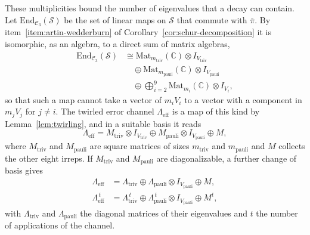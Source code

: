 These multiplicities bound the number of eigenvalues that a decay can contain. Let $\mathrm{End}_{\mathcal{C}_3}(\mathcal{S})$ be the set of linear maps on $\mathcal{S}$ that commute with $\bar\pi$. By item~\ref{item:artin-wedderburn} of Corollary~\ref{cor:schur-decomposition} it is isomorphic, as an algebra, to a direct sum of matrix algebras,
\begin{align}
    \mathrm{End}_{\mathcal{C}_3}(\mathcal{S}) &\cong \mathrm{Mat}_{m_{\mathrm{triv}}}(\mathbb{C}) \otimes I_{V_{\mathrm{triv}}} \nonumber \\
    &\quad \oplus \mathrm{Mat}_{m_{\mathrm{pauli}}}(\mathbb{C})\otimes I_{V_{\mathrm{pauli}}} \nonumber \\
    &\quad \oplus \bigoplus_{i = 2}^9 \mathrm{Mat}_{m_i} (\mathbb{C}) \otimes I_{V_i} ,
\end{align}
so that such a map cannot take a vector of $m_i V_i$ to a vector with a component in $m_j V_j$ for $j \neq i$. The twirled error channel $\Lambda_{\mathrm{eff}}$ is a map of this kind by Lemma~\ref{lem:twirling}, and in a suitable basis it reads
\begin{equation}
    \Lambda_{\mathrm{eff}} = M_{\mathrm{triv}}\otimes I_{V_{\mathrm{triv}}} \oplus M_{\mathrm{pauli}} \otimes I_{V_{\mathrm{pauli}}} \oplus M ,
\end{equation}
where $M_{\mathrm{triv}}$ and $M_{\mathrm{pauli}}$ are square matrices of sizes $m_{\mathrm{triv}}$ and $m_{\mathrm{pauli}}$ and $M$ collects the other eight irreps. If $M_{\mathrm{triv}}$ and $M_{\mathrm{pauli}}$ are diagonalizable, a further change of basis gives
\begin{equation}
  \begin{aligned}
    \Lambda_{\mathrm{eff}} &= \Lambda_{\mathrm{triv}} \oplus \Lambda_{\mathrm{pauli}} \otimes I_{V_{\mathrm{pauli}}} \oplus M , \\
    \Lambda_{\mathrm{eff}}^{\,t} &= \Lambda_{\mathrm{triv}}^{\,t} \oplus \Lambda_{\mathrm{pauli}}^{\,t} \otimes I_{V_{\mathrm{pauli}}} \oplus M^{t} ,
  \end{aligned}
  \label{eq:twirl-logical}
\end{equation}
with $\Lambda_{\mathrm{triv}}$ and $\Lambda_{\mathrm{pauli}}$ the diagonal matrices of their eigenvalues and $t$ the number of applications of the channel.

